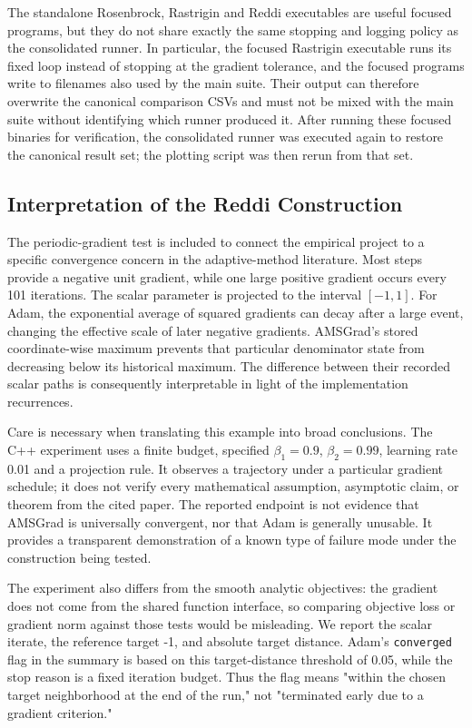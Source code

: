 ﻿\documentclass[conference]{IEEEtran}
\begin{document}
The standalone Rosenbrock, Rastrigin and Reddi executables are useful focused programs, but they do not share exactly the same stopping and logging policy as the consolidated runner. In particular, the focused Rastrigin executable runs its fixed loop instead of stopping at the gradient tolerance, and the focused programs write to filenames also used by the main suite. Their output can therefore overwrite the canonical comparison CSVs and must not be mixed with the main suite without identifying which runner produced it. After running these focused binaries for verification, the consolidated runner was executed again to restore the canonical result set; the plotting script was then rerun from that set.
\subsection{Interpretation of the Reddi Construction}
The periodic-gradient test is included to connect the empirical project to a specific convergence concern in the adaptive-method literature. Most steps provide a negative unit gradient, while one large positive gradient occurs every 101 iterations. The scalar parameter is projected to the interval $[-1,1]$. For Adam, the exponential average of squared gradients can decay after a large event, changing the effective scale of later negative gradients. AMSGrad's stored coordinate-wise maximum prevents that particular denominator state from decreasing below its historical maximum. The difference between their recorded scalar paths is consequently interpretable in light of the implementation recurrences.

Care is necessary when translating this example into broad conclusions. The C++ experiment uses a finite budget, specified $\beta_1=0.9$, $\beta_2=0.99$, learning rate 0.01 and a projection rule. It observes a trajectory under a particular gradient schedule; it does not verify every mathematical assumption, asymptotic claim, or theorem from the cited paper. The reported endpoint is not evidence that AMSGrad is universally convergent, nor that Adam is generally unusable. It provides a transparent demonstration of a known type of failure mode under the construction being tested.

The experiment also differs from the smooth analytic objectives: the gradient does not come from the shared function interface, so comparing objective loss or gradient norm against those tests would be misleading. We report the scalar iterate, the reference target -1, and absolute target distance. Adam's \texttt{converged} flag in the summary is based on this target-distance threshold of 0.05, while the stop reason is a fixed iteration budget. Thus the flag means "within the chosen target neighborhood at the end of the run," not "terminated early due to a gradient criterion."
\end{document}

